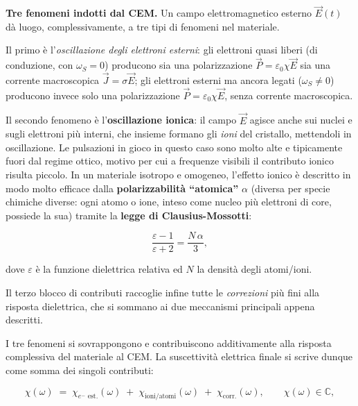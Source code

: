 \textbf{Tre fenomeni indotti dal CEM.} Un campo elettromagnetico esterno \( \vec{E}(t) \) dà luogo, complessivamente, a tre tipi di fenomeni nel materiale.

Il primo è l'\emph{oscillazione degli elettroni esterni}: gli elettroni quasi liberi (di conduzione, con \( \omega_S = 0 \)) producono sia una polarizzazione \( \vec{P} = \varepsilon_0 \chi \vec{E} \) sia una corrente macroscopica \( \vec{J} = \sigma \vec{E} \); gli elettroni esterni ma ancora legati (\( \omega_S \neq 0 \)) producono invece solo una polarizzazione \( \vec{P} = \varepsilon_0 \chi \vec{E} \), senza corrente macroscopica.

Il secondo fenomeno è l'\textbf{oscillazione ionica}: il campo \( \vec{E} \) agisce anche sui nuclei e sugli elettroni più interni, che insieme formano gli \emph{ioni} del cristallo, mettendoli in oscillazione. Le pulsazioni in gioco in questo caso sono molto alte e tipicamente fuori dal regime ottico, motivo per cui a frequenze visibili il contributo ionico risulta piccolo. In un materiale isotropo e omogeneo, l'effetto ionico è descritto in modo molto efficace dalla \textbf{polarizzabilità ``atomica''} \( \alpha \) (diversa per specie chimiche diverse: ogni atomo o ione, inteso come nucleo più elettroni di core, possiede la sua) tramite la \textbf{legge di Clausius-Mossotti}:

\begin{importantbox}
    \begin{equation}
        \frac{\varepsilon - 1}{\varepsilon + 2} = \frac{N \, \alpha}{3},
    \end{equation}
\end{importantbox}

dove \( \varepsilon \) è la funzione dielettrica relativa ed \( N \) la densità degli atomi/ioni.

Il terzo blocco di contributi raccoglie infine tutte le \emph{correzioni} più fini alla risposta dielettrica, che si sommano ai due meccanismi principali appena descritti.

I tre fenomeni si sovrappongono e contribuiscono additivamente alla risposta complessiva del materiale al CEM. La suscettività elettrica finale si scrive dunque come somma dei singoli contributi:

\begin{importantbox}
    \begin{equation}
        \chi(\omega) \;=\; \chi_{e^{-}\text{ est.}}(\omega) \;+\; \chi_{\text{ioni/atomi}}(\omega) \;+\; \chi_{\text{corr.}}(\omega), \qquad \chi(\omega) \in \mathbb{C},
    \end{equation}
\end{importantbox}

